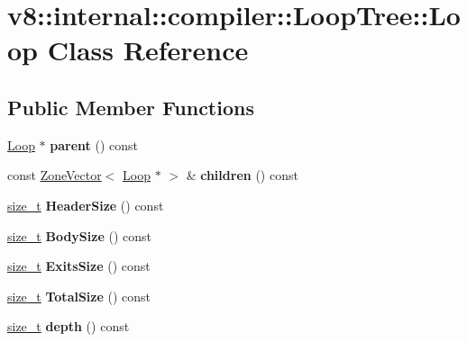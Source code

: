 \hypertarget{classv8_1_1internal_1_1compiler_1_1LoopTree_1_1Loop}{}\section{v8\+:\+:internal\+:\+:compiler\+:\+:Loop\+Tree\+:\+:Loop Class Reference}
\label{classv8_1_1internal_1_1compiler_1_1LoopTree_1_1Loop}
\subsection*{Public Member Functions}
\begin{DoxyCompactItemize}
\item 
\mbox{\label{classv8_1_1internal_1_1compiler_1_1LoopTree_1_1Loop_ab3aa386851fbce67b6052918fd2f38a9}} 
\mbox{\hyperlink{classv8_1_1internal_1_1compiler_1_1LoopTree_1_1Loop}{Loop}} $\ast$ {\bfseries parent} () const
\item 
\mbox{\label{classv8_1_1internal_1_1compiler_1_1LoopTree_1_1Loop_a39cd3cbe9ce37d88981d13177b4141bc}} 
const \mbox{\hyperlink{classv8_1_1internal_1_1ZoneVector}{Zone\+Vector}}$<$ \mbox{\hyperlink{classv8_1_1internal_1_1compiler_1_1LoopTree_1_1Loop}{Loop}} $\ast$ $>$ \& {\bfseries children} () const
\item 
\mbox{\label{classv8_1_1internal_1_1compiler_1_1LoopTree_1_1Loop_ad4e02ca4d7edd99e9ddf527b4a4855d1}} 
\mbox{\hyperlink{classsize__t}{size\+\_\+t}} {\bfseries Header\+Size} () const
\item 
\mbox{\label{classv8_1_1internal_1_1compiler_1_1LoopTree_1_1Loop_a825f6478293b7cae5a094e892e3c9ce6}} 
\mbox{\hyperlink{classsize__t}{size\+\_\+t}} {\bfseries Body\+Size} () const
\item 
\mbox{\label{classv8_1_1internal_1_1compiler_1_1LoopTree_1_1Loop_ad38f733de184b41847db1405b35742f0}} 
\mbox{\hyperlink{classsize__t}{size\+\_\+t}} {\bfseries Exits\+Size} () const
\item 
\mbox{\label{classv8_1_1internal_1_1compiler_1_1LoopTree_1_1Loop_a67463cc7ed5f6a9aea36415d1ba6aa32}} 
\mbox{\hyperlink{classsize__t}{size\+\_\+t}} {\bfseries Total\+Size} () const
\item 
\mbox{\label{classv8_1_1internal_1_1compiler_1_1LoopTree_1_1Loop_a765407b2aa960b0a7ee2411fd6aabfa9}} 
\mbox{\hyperlink{classsize__t}{size\+\_\+t}} {\bfseries depth} () const
\end{DoxyCompactItemize}
